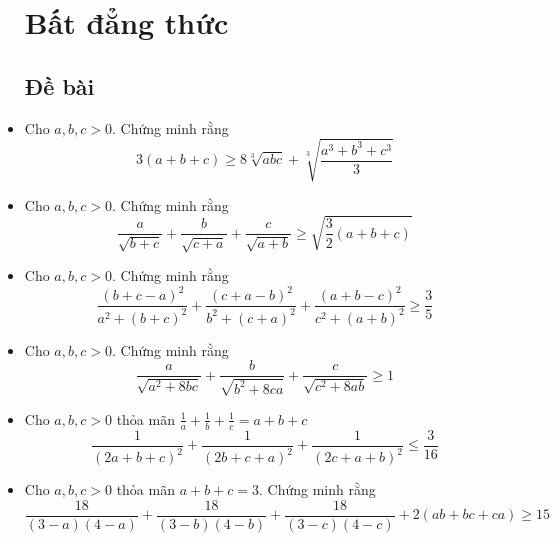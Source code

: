 \documentclass[11pt]{scrartcl}
\begin{document}
\begin{itemize}[label=, leftmargin=0em, itemsep=0.5em]
    \section{\huge Bất đẳng thức}
    \subsection{\LARGE \textcolor{dk}{Đề bài}}
        \item \begin{btvn}
            Cho $a,b,c >0$. Chứng minh rằng
            \[
                3(a + b + c) \geq 8\sqrt[3]{abc} + \sqrt[3]{\frac{a^3 + b^3 + c^3}{3}}
            \]
        \end{btvn}
        \item \begin{btvn} Cho $a,b,c > 0$. Chứng minh rằng 
        \[
            \frac{a}{\sqrt{b + c}} + \frac{b}{\sqrt{c + a}} + \frac{c}{\sqrt{a + b}} \geq \sqrt{\frac{3}{2}(a + b + c)}
        \]
    \end{btvn}
        \item \begin{btvn}
            Cho $a,b,c >0$. Chứng minh rằng
            \[
                \frac{(b + c - a)^2}{a^2 + (b + c)^2} + \frac{(c + a - b)^2}{b^2 + (c + a)^2} + \frac{(a + b - c)^2}{c^2 + (a + b)^2} \geq \frac{3}{5}
            \]
        \end{btvn}
        \item \begin{btvn}
            Cho $a,b,c >0$. Chứng minh rằng
            \[
                \frac{a}{\sqrt{a^2 + 8bc}} + \frac{b}{\sqrt{b^2 + 8ca}} + \frac{c}{\sqrt{c^2 + 8ab}} \geq 1
            \]
        \end{btvn}
        \item \begin{btvn}
            Cho $a,b,c >0$ thỏa mãn $\frac{1}{a} + \frac{1}{b} + \frac{1}{c} = a + b + c$
            \[
                \frac{1}{(2a + b + c)^2} + \frac{1}{(2b + c + a)^2} + \frac{1}{(2c + a + b)^2} \leq \frac{3}{16}
            \]
        \end{btvn}
        \item \begin{btvn}
            Cho $a,b,c >0$ thỏa mãn $a + b + c = 3$. Chứng minh rằng
            \[
                \frac{18}{(3 -a )(4 - a)} + \frac{18}{(3 -b)(4 - b)} + \frac{18}{(3 -c )(4 - c)} + 2(ab + bc + ca) \geq 15
\]
\end{btvn}
\end{itemize}
\end{document}
